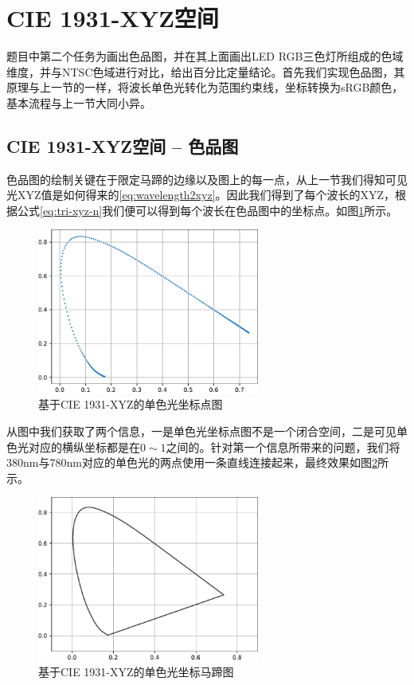 \section{CIE 1931-XYZ空间}
题目中第二个任务为画出色品图，并在其上面画出LED RGB三色灯所组成的色域维度，并与NTSC色域进行对比，给出百分比定量结论。首先我们实现色品图，其原理与上一节的一样，将波长单色光转化为范围约束线，坐标转换为sRGB颜色，基本流程与上一节大同小异。

\subsection{CIE 1931-XYZ空间 -- 色品图}

色品图的绘制关键在于限定马蹄的边缘以及图上的每一点，从上一节我们得知可见光XYZ值是如何得来的\eqref{eq:wavelength2xyz}。因此我们得到了每个波长的XYZ，根据公式\eqref{eq:tri-xyz-n}我们便可以得到每个波长在色品图中的坐标点。如图\ref{fig:sd1931edges}所示。

\begin{figure}[htbp]
    \centering
    \includegraphics[width=0.65\textwidth]{./imgs/sec3/cd-edge-s.pdf}
    \caption{基于CIE 1931-XYZ的单色光坐标点图}
    \label{fig:sd1931edges}
\end{figure}

从图中我们获取了两个信息，一是单色光坐标点图不是一个闭合空间，二是可见单色光对应的横纵坐标都是在$0\sim1$之间的。针对第一个信息所带来的问题，我们将380nm与780nm对应的单色光的两点使用一条直线连接起来，最终效果如图\ref{fig:sd1931edge}所示。

\begin{figure}[htbp]
    \centering
    \includegraphics[width=0.65\textwidth]{./imgs/sec3/cd-edge.pdf}
    \caption{基于CIE 1931-XYZ的单色光坐标马蹄图}
    \label{fig:sd1931edge}
\end{figure}

